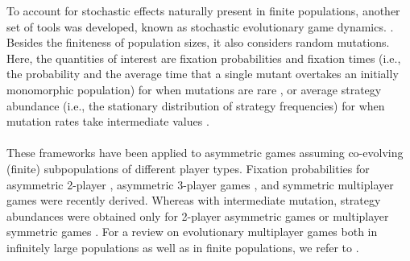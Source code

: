 \documentclass[11pt]{article}
\theoremstyle{plainCl1}
\theoremstyle{plainCl2}
\begin{document}
\noindent To account for stochastic effects naturally present in finite populations, another set of tools was developed, known as stochastic evolutionary game dynamics.  \cite{Nowak:Nature:2004, Traulsen:bookchapter:2009}. Besides the finiteness of population sizes, it also considers random mutations. Here, the quantities of interest are fixation probabilities and fixation times (i.e., the probability and the average time that a single mutant overtakes an initially monomorphic population) for when mutations are rare \cite{Fudenberg:TPB:2006}, or average strategy abundance (i.e., the stationary distribution of strategy frequencies) for when mutation rates take intermediate values \cite{antal:JTB:2009a, antal:JTB:2009b}. 
\\ \\
\noindent 
These frameworks have been applied to asymmetric games assuming co-evolving (finite) subpopulations of different player types. Fixation probabilities for asymmetric 2-player \cite{Sekiguchi:DGA:2017}, asymmetric 3-player games \cite{Sekiguchi:DGAA:2022}, and symmetric multiplayer games \cite{Kurokawa:PRSB:2009, gokhale:PNAS:2010} were recently derived. Whereas with intermediate mutation, strategy abundances were obtained only for 2-player asymmetric games \cite{Ohtsuki:JTB:2010, Sekiguchi:PA:2013} or multiplayer symmetric games \cite{gokhale:JTB:2011, Wu:Games:2013, Kroumi:Jmb:2022}. For a review on evolutionary multiplayer games both in infinitely large populations as well as in finite populations, we refer to \cite{Gokhale:DGAA:2014}.\\ 

\end{document}
